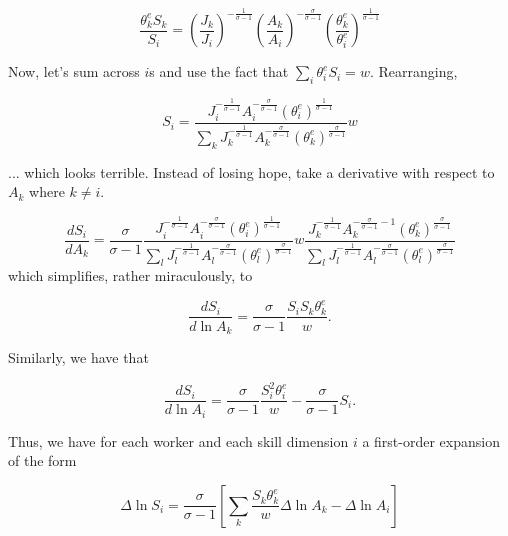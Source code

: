 \documentclass[12pt]{article}
\begin{document}
\begin{equation}
\frac{\theta_k^e S_k}{S_i}=\left(\frac{J_k}{J_i}\right)^{-\frac 1 {\sigma-1}} \left(\frac{A_k}{A_i}\right)^{-\frac \sigma {\sigma-1}}  \left(\frac{\theta_k^e}{\theta_i^e}\right)^{\frac {1}{\sigma-1}}
\end{equation}

Now, let's sum across $i$s and use the fact that $\sum_i\theta_i^eS_i=w$. Rearranging,


\begin{equation}
S_i=\frac{J_i^{-\frac{1}{\sigma-1}}A_i^{-\frac{\sigma}{\sigma-1}}(\theta_i^e)^{\frac{1}{\sigma-1}}}{\sum_k J_k^{-\frac{1}{\sigma-1}}A_k^{-\frac{\sigma}{\sigma-1}}(\theta_k^e)^{\frac{\sigma}{\sigma-1}}}w
\end{equation}

... which looks terrible. Instead of losing hope, take a derivative with respect to $A_k$ where $k \neq i$.

\begin{equation}
\frac{dS_i}{dA_k}=\frac{\sigma}{\sigma-1} \frac{J_i^{-\frac{1}{\sigma-1}}A_i^{-\frac{\sigma}{\sigma-1}}(\theta_i^e)^{\frac{1}{\sigma-1}}}{\sum_l J_l^{-\frac{1}{\sigma-1}}A_l^{-\frac{\sigma}{\sigma-1}}(\theta_l^e)^{\frac{\sigma}{\sigma-1}}}w
\frac{J_k^{-\frac{1}{\sigma-1}}A_k^{-\frac{\sigma}{\sigma-1}-1}(\theta_k^e)^{\frac{\sigma}{\sigma-1}}}{\sum_l J_l^{-\frac{1}{\sigma-1}}A_l^{-\frac{\sigma}{\sigma-1}}(\theta_l^e)^{\frac{\sigma}{\sigma-1}}}
\end{equation}
which simplifies, rather miraculously, to



\begin{equation}
\frac{dS_i}{d\ln A_k}=\frac{\sigma}{\sigma-1}\frac{S_i S_k\theta_k^e}{w}.
\end{equation}


Similarly, we have that

\begin{equation}
\frac{dS_i}{d\ln A_i}=\frac{\sigma}{\sigma-1}\frac{S_i^2\theta_i^e}{w}-\frac{\sigma}{\sigma-1}S_i.
\end{equation}



Thus, we have for each worker and each skill dimension $i$ a first-order expansion of the form

\begin{equation}\label{basiceq}
\Delta \ln S_i= \frac{\sigma}{\sigma-1}\left[\sum_k \frac{S_k\theta^e_k}{w} \Delta \ln A_k-\Delta \ln A_i\right]
\end{equation}
\end{document}

